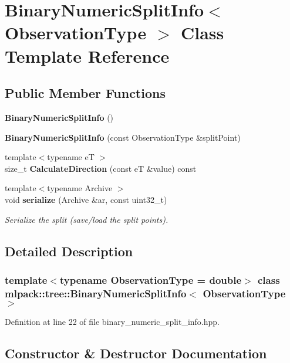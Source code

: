 \section{Binary\+Numeric\+Split\+Info$<$ Observation\+Type $>$ Class Template Reference}
\label{classmlpack_1_1tree_1_1BinaryNumericSplitInfo}
\subsection*{Public Member Functions}
\begin{DoxyCompactItemize}
\item 
\textbf{ Binary\+Numeric\+Split\+Info} ()
\item 
\textbf{ Binary\+Numeric\+Split\+Info} (const Observation\+Type \&split\+Point)
\item 
{\footnotesize template$<$typename eT $>$ }\\size\+\_\+t \textbf{ Calculate\+Direction} (const eT \&value) const
\item 
{\footnotesize template$<$typename Archive $>$ }\\void \textbf{ serialize} (Archive \&ar, const uint32\+\_\+t)
\begin{DoxyCompactList}\small\item\em Serialize the split (save/load the split points). \end{DoxyCompactList}\end{DoxyCompactItemize}


\subsection{Detailed Description}
\subsubsection*{template$<$typename Observation\+Type = double$>$\newline
class mlpack\+::tree\+::\+Binary\+Numeric\+Split\+Info$<$ Observation\+Type $>$}



Definition at line 22 of file binary\+\_\+numeric\+\_\+split\+\_\+info.\+hpp.



\subsection{Constructor \& Destructor Documentation}
\mbox{\label{classmlpack_1_1tree_1_1BinaryNumericSplitInfo_aed83ede456468042b3971657e90a2c02}} 
